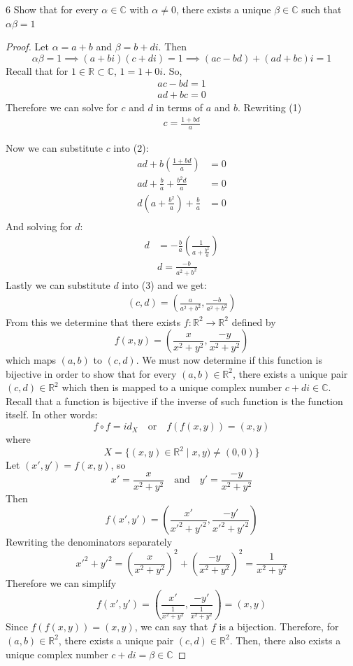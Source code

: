 \documentclass[12pt]{article}
\newenvironment{problem}[1]{\begin{prob*}{#1}{}}{\end{prob*}}
\begin{document}
\begin{problem}{6}
Show that for every $\alpha \in \mathbb{C}$ with $\alpha \ne 0$, there exists a unique $\beta \in \mathbb{C}$ such that $\alpha \beta=1$
\end{problem}
\begin{proof}
    Let $\alpha = a + b$ and $\beta = b+di$. Then
    \[\alpha\beta =1 \implies (a+bi)(c+di)=1 \implies (ac-bd)+(ad+bc)i=1\]
    Recall that for $1\in \mathbb{R}\subset \mathbb{C}$, $1=1+0i$. So, 
    \begin{align}
        ac-bd=1 \\
        ad+bc=0
    \end{align}
    Therefore we can solve for $c$ and $d$ in terms of $a$ and $b$. Rewriting (1)
    \begin{align}
        c=\frac{1+bd}{a}
    \end{align}

    Now we can substitute $c$ into (2):
    \begin{align*}
        ad+b(\frac{1+bd}{a})&=0\\
        ad+\frac{b}{a}+\frac{b^2d}{a}&=0\\
        d(a+\frac{b^2}{a})+\frac{b}{a}&=0\\
    \end{align*}
    And solving for $d$:
    \begin{align*}
        d&=-\frac{b}{a} \left(\frac{1}{a+\frac{b^2}
        {a}}\right)\\ 
        &d= \frac{-b}{a^2+b^2}
    \end{align*}
    Lastly we can substitute $d$ into (3) and we get:
    \begin{align}
        (c,d)=\left(\frac{a}{a^2+b^2},\frac{-b}{a^2+b^2}\right)
    \end{align}
    From this we determine that there exists $f:\mathbb{R}^2\to \mathbb{R}^2$ defined by
    \[f(x,y)=\left(\frac{x}{x^2+y^2},\frac{-y}{x^2+y^2}\right)\]
    which maps $(a,b)$ to $(c,d)$. We must now determine if this function is bijective in order to show that for every $(a,b)\in \mathbb{R}^2$, there exists a unique pair $(c,d)\in\mathbb{R}^2$ which then is mapped to a unique complex number $c+di\in \mathbb{C}$.\\
    Recall that a function is bijective if the inverse of such function is the function itself. In other words:
    \[f \circ f = id_X \quad \text{or} \quad f(f(x,y))=(x,y)\]
    where 
    \[X=\{(x,y)\in\mathbb{R}^2\mid x,y)\ne (0,0)\}\]
    Let $(x',y')=f(x,y)$, so
    \[x'=\frac{x}{x^2+y^2} \quad \text{and} \quad y'=\frac{-y}{x^2+y^2}\]
    Then 
    \[f(x',y')=\left(\frac{x'}{x'^2+y'^2},\frac{-y'}{x'^2+y'^2}\right)\]
    Rewriting the denominators separately
    \[x'^2+y'^2=\left(\frac{x}{x^2+y^2}\right)^2+\left(\frac{-y}{x^2+y^2} \right)^2=\frac{1}{x^2+y^2}\]
    Therefore we can simplify
    \[f(x',y')=\left(\frac{x'}{\frac{1}{x^2+y^2}},\frac{-y'}{\frac{1}{x^2+y^2}} \right)=(x,y)\]
    Since $f(f(x,y))=(x,y)$, we can say that $f$ is a bijection. Therefore, for $(a,b)\in \mathbb{R}^2$, there exists a unique pair $(c,d)\in \mathbb{R}^2$. Then, there also exists a unique complex number $c+di=\beta \in \mathbb{C}$
\end{proof}
\end{document}

